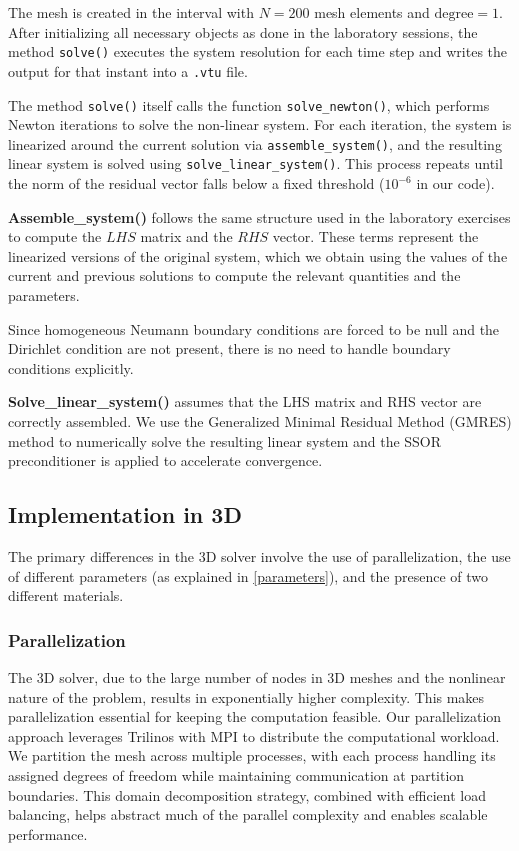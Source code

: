 \documentclass[12pt, a4paper, twoside, openright]{report}
\begin{document}
The mesh is created in the interval with \( N = 200 \) mesh elements and \( \text{degree} = 1 \). After initializing all necessary objects as done in the laboratory sessions, the method \texttt{solve()} executes the system resolution for each time step and writes the output for that instant into a \verb|.vtu| file.

The method \texttt{solve()} itself calls the function \texttt{solve\_newton()}, which performs Newton iterations to solve the non-linear system. For each iteration, the system is linearized around the current solution via \texttt{assemble\_system()}, and the resulting linear system is solved using \texttt{solve\_linear\_system()}. This process repeats until the norm of the residual vector falls below a fixed threshold (\( 10^{-6} \) in our code).

\textbf{Assemble\_system()} follows the same structure used in the laboratory exercises to compute the $LHS$ matrix and the $RHS$ vector. These terms represent the linearized versions of the original system, which we obtain using the values of the current and previous solutions to compute the relevant quantities and the parameters.

Since homogeneous Neumann boundary conditions are forced to be null and the Dirichlet condition are not present, there is no need to handle boundary conditions explicitly.

\textbf{Solve\_linear\_system()} assumes that the LHS matrix and RHS vector are correctly assembled. We use the Generalized Minimal Residual Method (GMRES) method to numerically solve the resulting linear system and the SSOR preconditioner is applied to accelerate convergence.

\subsection{Implementation in 3D}
The primary differences in the 3D solver involve the use of parallelization, the use of different parameters (as explained in \autoref{parameters}), and the presence of two different materials.
\subsubsection{Parallelization}
The 3D solver, due to the large number of nodes in 3D meshes and the nonlinear nature of the problem, results in exponentially higher complexity. This makes parallelization essential for keeping the computation feasible.
Our parallelization approach leverages Trilinos with MPI to distribute the computational workload. We partition the mesh across multiple processes, with each process handling its assigned degrees of freedom while maintaining communication at partition boundaries. This domain decomposition strategy, combined with efficient load balancing, helps abstract much of the parallel complexity and enables scalable performance.
\end{document}
